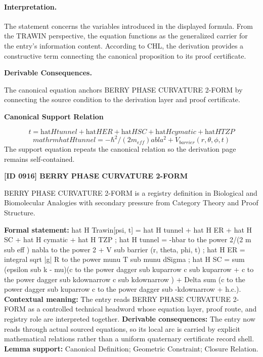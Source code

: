 \paragraph{Interpretation.}
The statement concerns the variables introduced in the displayed formula. From the TRAWIN perspective, the equation functions as the generalized carrier for the entry’s information content. According to CHL, the derivation provides a constructive term connecting the canonical proposition to its proof certificate.

\par\vspace{0.35em}
\noindent\textbf{Derivable Consequences.}\quad
\begingroup
\footnotesize
\raggedright
The canonical equation anchors BERRY PHASE CURVATURE 2-FORM by connecting the source condition to the derivation layer and proof certificate.
\par\endgroup

\noindent\textbf{Canonical Support Relation}\par
\[
t = \mathrm{hat}{H}tunnel + \mathrm{hat}{H}ER + \mathrm{hat}{H}SC + \mathrm{hat}{H}cymatic + \mathrm{hat}{H}TZP
\]
\[
mathrm{hat}{H}tunnel = -\hbar^2/(2 m_{eff})  abla^2 + V_{barrier}(r, \theta, \phi, t)
\]
\noindent The support equation repeats the canonical relation so the derivation page remains self-contained.\par

\clearpage
\noindent\textbf{[ID 0916] BERRY PHASE CURVATURE 2-FORM}\par
\vspace{0.35em}
\begingroup\small
{}
BERRY PHASE CURVATURE 2-FORM is a registry definition in Biological and Biomolecular Analogies with secondary pressure from Category Theory and Proof Structure.

\begingroup\footnotesize\setlength{\emergencystretch}{3em}\sloppy
\textbf{Formal statement:} hat H Trawin[psi, t] = hat H tunnel + hat H ER + hat H SC + hat H cymatic + hat H TZP ; hat H tunnel = -hbar to the power 2/(2 m sub eff ) nabla to the power 2 + V sub barrier (r, theta, phi, t) ; hat H ER = integral sqrt |g| R to the power munu T sub munu dSigma ; hat H SC = sum (epsilon sub k - mu)(c to the power dagger sub kuparrow c sub kuparrow + c to the power dagger sub kdownarrow c sub kdownarrow ) + Delta sum (c to the power dagger sub kuparrow c to the power dagger sub -kdownarrow + h.c.). \textbf{Contextual meaning:} The entry reads BERRY PHASE CURVATURE 2-FORM as a controlled technical headword whose equation layer, proof route, and registry role are interpreted together. \textbf{Derivable consequences:} The entry now reads through actual sourced equations, so its local arc is carried by explicit mathematical relations rather than a uniform quaternary certificate record shell. \textbf{Lemma support:} Canonical Definition; Geometric Constraint; Closure Relation.\par
\endgroup

